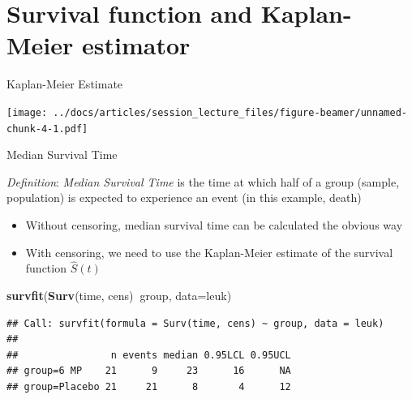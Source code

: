 \documentclass[
  ignorenonframetext,
]{beamer}
\newenvironment{Shaded}{\begin{snugshade}}{\end{snugshade}}
\newcommand{\DataTypeTok}[1]{\textcolor[rgb]{0.13,0.29,0.53}{#1}}
\newcommand{\KeywordTok}[1]{\textcolor[rgb]{0.13,0.29,0.53}{\textbf{#1}}}
\newcommand{\NormalTok}[1]{#1}
\newcommand{\OperatorTok}[1]{\textcolor[rgb]{0.81,0.36,0.00}{\textbf{#1}}}
\providecommand{\tightlist}{%
  \setlength{\itemsep}{0pt}\setlength{\parskip}{0pt}}
\begin{document}
\hypertarget{survival-function-and-kaplan-meier-estimator}{%
\section{Survival function and Kaplan-Meier
estimator}\label{survival-function-and-kaplan-meier-estimator}}

\begin{frame}{Kaplan-Meier Estimate}
\protect\hypertarget{kaplan-meier-estimate}{}

\texttt{[image: ../docs/articles/session\_lecture\_files/figure-beamer/unnamed-chunk-4-1.pdf]}

\end{frame}

\begin{frame}[fragile]{Median Survival Time}
\protect\hypertarget{median-survival-time}{}

\emph{Definition}: \emph{Median Survival Time} is the time at which half
of a group (sample, population) is expected to experience an event (in
this example, death)

\begin{itemize}
\tightlist
\item
  Without censoring, median survival time can be calculated the obvious
  way
\item
  With censoring, we need to use the Kaplan-Meier estimate of the
  survival function \(\hat S(t)\)
\end{itemize}

\footnotesize

\begin{Shaded}
\begin{Highlighting}[]
\KeywordTok{survfit}\NormalTok{(}\KeywordTok{Surv}\NormalTok{(time, cens)}\OperatorTok{~}\NormalTok{group, }\DataTypeTok{data=}\NormalTok{leuk)}
\end{Highlighting}
\end{Shaded}

\begin{verbatim}
## Call: survfit(formula = Surv(time, cens) ~ group, data = leuk)
## 
##                n events median 0.95LCL 0.95UCL
## group=6 MP    21      9     23      16      NA
## group=Placebo 21     21      8       4      12
\end{verbatim}

\end{frame}
\end{document}
